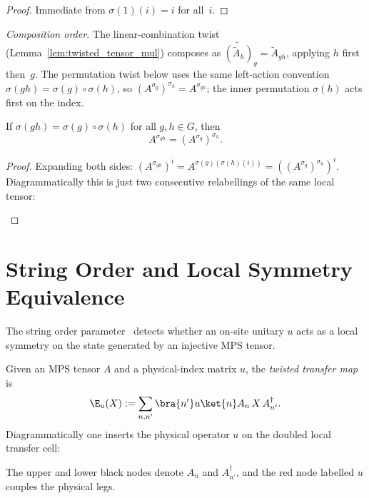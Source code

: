 \begin{proof}\leanok{}
    Immediate from $\sigma(1)(i) = i$ for all~$i$.
\end{proof}

\noindent\emph{Composition order.}
The linear-combination twist (Lemma~\ref{lem:twisted_tensor_mul}) composes as
$\widetilde{(\widetilde{A}_h)}_g = \widetilde{A}_{gh}$, applying $h$ first
then~$g$. The permutation twist below uses the same left-action convention
$\sigma(gh) = \sigma(g) \circ \sigma(h)$, so
$(A^{\sigma_g})^{\sigma_h} = A^{\sigma_{gh}}$; the inner permutation $\sigma(h)$
acts first on the index.

\begin{lemma}\label{lem:perm_twisted_mul}
    \leanok
    If $\sigma(gh) = \sigma(g) \circ \sigma(h)$ for all $g, h \in G$,
    then
    \[
        A^{\sigma_{gh}} =  (A^{\sigma_g})^{\sigma_h}.
    \]
\end{lemma}

\begin{proof}\leanok{}
    Expanding both sides:
    $(A^{\sigma_{gh}})^i = A^{\sigma(g)(\sigma(h)(i))} = ((A^{\sigma_g})^{\sigma_h})^i$.
    Diagrammatically this is just two consecutive relabellings of the same
    local tensor:
    \begin{center}
        \qquad
    \end{center}
\end{proof}

\section{String Order and Local Symmetry Equivalence}

The string order parameter~\cite{PerezGarcia2008StringOrder} detects
whether an on-site unitary $u$ acts as a local symmetry on the state
generated by an injective MPS tensor.

\begin{definition}\label{def:twisted_transfer_map}
    \leanok
    Given an MPS tensor $A$ and a physical-index matrix $u$, the
    \emph{twisted transfer map} is
    \[
        \E_u(X) :=  \sum_{n,n'} \bra{n'} u \ket{n}
        A_n\, X\, A_{n'}^\dagger.
    \]
    Diagrammatically one inserts the physical operator $u$ on the doubled
    local transfer cell:
    \begin{center}
    \end{center}
    The upper and lower black nodes denote $A_n$ and $A_{n'}^\dagger$, and the
    red node labelled $u$ couples the physical legs.
\end{definition}

